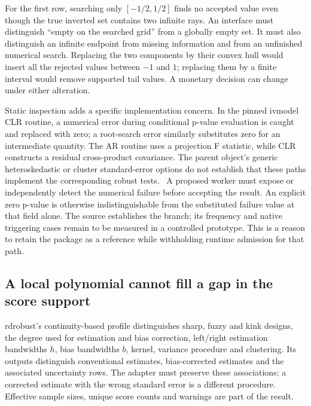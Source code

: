 For the first row, searching only $[-1/2,1/2]$ finds no accepted value even
though the true inverted set contains two infinite rays. An interface must
distinguish ``empty on the searched grid'' from a globally empty set. It must
also distinguish an infinite endpoint from missing information and from an
unfinished numerical search. Replacing the two components by their convex hull
would insert all the rejected values between $-1$ and $1$; replacing them by a
finite interval would remove supported tail values. A monetary decision can
change under either alteration.

Static inspection adds a specific implementation concern. In the pinned
ivmodel CLR routine, a numerical error during conditional p-value evaluation is
caught and replaced with zero; a root-search error similarly substitutes zero
for an intermediate quantity. The AR routine uses a projection F statistic,
while CLR constructs a residual cross-product covariance. The parent object's
generic heteroskedastic or cluster standard-error options do not establish that
these paths implement the corresponding robust tests.~\citep{exec22_riv_ivmodel}
A proposed worker must expose or independently detect the numerical failure
before accepting the result. An explicit zero p-value is otherwise
indistinguishable from the substituted failure value at that field alone. The
source establishes the branch; its frequency and native triggering cases remain
to be measured in a controlled prototype. This is a reason to retain the
package as a reference while withholding runtime admission for that path.

\subsection{A local polynomial cannot fill a gap in the score support}
\label{exec22:riv-continuity}

rdrobust's continuity-based profile distinguishes sharp, fuzzy and kink designs,
the degree used for estimation and bias correction, left/right estimation
bandwidths $h$, bias bandwidths $b$, kernel, variance procedure and clustering.
Its outputs distinguish conventional estimates, bias-corrected estimates and
the associated uncertainty rows. The adapter must preserve these associations;
a corrected estimate with the wrong standard error is a different procedure.
Effective sample sizes, unique score counts and warnings are part of the result.
\citep{exec22_riv_rdrobust}

